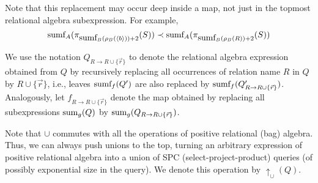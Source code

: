 Note that this replacement may occur deep inside a map, not just in the topmost
relational algebra subexpression. For example,
\[
\mbox{sumf}_A(\pi_{\mbox{sumf}_B(\rho_B({\langle b\rangle})) + 2}(S))
\prec
\mbox{sumf}_A(\pi_{\mbox{sumf}_B(\rho_B(R)) + 2}(S))
\]

We use the notation $Q_{R \rightarrow R \cup \{\vec{r}\}}$ to denote
the relational algebra expression obtained from $Q$
by recursively replacing all occurrences of relation name $R$ in $Q$
by $R \cup \{\vec{r}\}$,
i.e., leaves $\mbox{sumf}_f(Q')$ are also replaced by
$\mbox{sumf}_f(Q'_{R \rightarrow R \cup \{\vec{r}\}})$.
Analogously, let $f_{R \rightarrow R \cup \{\vec{r}\}}$ denote the map obtained by
replacing all subexpressions $\mathrm{sum}_g(Q)$ by
$\mathrm{sum}_g(Q_{R \rightarrow R \cup \{\vec{r}\}})$.

Note that $\cup$ commutes with all the operations of positive relational 
(bag) algebra. Thus, we can always push unions to the top, turning an arbitrary
expression of positive relational algebra into a union of SPC (select-project-product)
queries (of possibly exponential size in the query).
We denote this operation by $\uparrow_{\cup}(Q)$.



